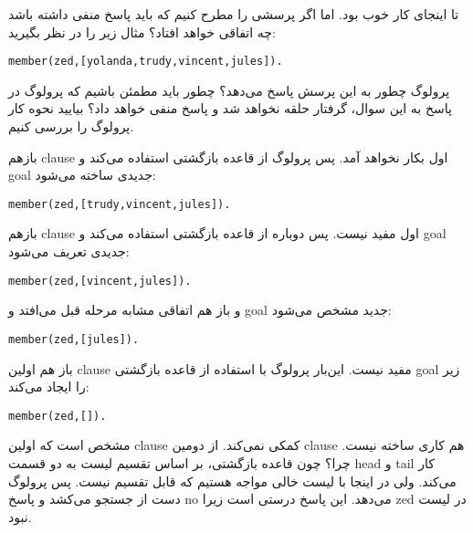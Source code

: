 تا اینجای کار خوب بود. اما اگر پرسشی را مطرح کنیم که باید پاسخ منفی داشته باشد چه اتفاقی خواهد افتاد؟ مثال زیر را در نظر بگیرید:

\begin{latin}
\begin{lstlisting}
member(zed,[yolanda,trudy,vincent,jules]).
\end{lstlisting}
\end{latin}

پرولوگ چطور به این پرسش پاسخ می‌دهد؟ چطور باید مطمئن باشیم که پرولوگ در پاسخ به این سوال، گرفتار حلقه نخواهد شد و پاسخ منفی خواهد داد؟ بیایید نحوه کار پرولوگ را بررسی کنیم.

بازهم clause اول بکار نخواهد آمد. پس پرولوگ از قاعده بازگشتی استفاده می‌کند و goal جدیدی ساخته می‌شود:

\begin{latin}
\begin{lstlisting}
member(zed,[trudy,vincent,jules]).
\end{lstlisting}
\end{latin}

بازهم clause اول مفید نیست. پس دوباره از قاعده بازگشتی استفاده می‌کند و goal جدیدی تعریف می‌شود:

\begin{latin}
\begin{lstlisting}
member(zed,[vincent,jules]).
\end{lstlisting}
\end{latin}

و باز هم اتفاقی مشابه مرحله قبل می‌افتد و goal جدید مشخص می‌شود:

\begin{latin}
\begin{lstlisting}
member(zed,[jules]).
\end{lstlisting}
\end{latin}

باز هم اولین clause مفید نیست. این‌بار پرولوگ با استفاده از قاعده بازگشتی goal زیر را ایجاد می‌کند:

\begin{latin}
\begin{lstlisting}
member(zed,[]).
\end{lstlisting}
\end{latin}

مشخص است که اولین clause کمکی نمی‌کند. از دومین clause هم کاری ساخته نیست. چرا؟ چون قاعده بازگشتی، بر اساس تقسیم لیست به دو قسمت head و tail کار می‌کند. ولی در اینجا با لیست خالی مواجه هستیم که قابل تقسیم نیست. پس پرولوگ دست از جستجو می‌کشد و پاسخ no می‌دهد. این پاسخ درستی است زیرا zed در لیست نبود.

